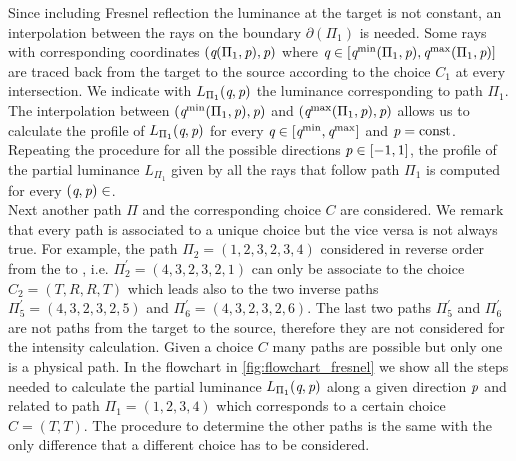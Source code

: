 Since including Fresnel reflection the luminance at the target is not constant, an interpolation between the rays on the boundary $\partial$$(\Pi_1)$ is needed. 
Some rays with corresponding coordinates $(\textit{q}(\Pi_1, \textit{p}), \textit{p})$ where 
$\textit{q}\in[\textit{q}^{\textrm{min}}(\Pi_1, \textit{p}), \textit{q}^{\textrm{max}}(\Pi_1, \textit{p})]$ are traced back from the target to the source according to the choice $C_1$ at every intersection.
We indicate with $L_{\Pi_1}(\textit{q},\textit{p})$ the luminance corresponding to path $\Pi_1$. The interpolation between 
$(\textit{q}^{\textrm{min}}(\Pi_1, \textit{p}), \textit{p})$ and $(\textit{q}^{\textrm{max}}(\Pi_1, \textit{p}), \textit{p})$ allows us to calculate the profile of $L_{\Pi_1}(\textit{q},\textit{p})$ for every $\textit{q}\in[\textit{q}^{\textrm{min}}, \textit{q}^{\textrm{max}}]$ and $\textit{p}=\textrm{const}$.
Repeating the procedure for all the possible directions $\textit{p}\in[-1,1]$, the profile of the partial luminance $L_{\Pi_1}$ given by all the rays that follow path $\Pi_1$ is computed for every $(\textit{q}, \textit{p})\in$. 
\\ \indent Next another path $\Pi$ and the corresponding choice $C$ are considered. We remark that every path is associated to a unique choice but the vice versa is not always true. For example, the path $\Pi_2 = (1,2,3,2,3,4)$ considered in reverse order from the  to , i.e. $\Pi_2^{\prime} = (4,3,2,3,2,1)$ can only be associate to the choice $C_2 = (T,R,R,T)$ which leads also to the two inverse paths $\Pi_5^{\prime}= (4,3,2,3,2,5)$ and $\Pi_6^{\prime}= (4,3,2,3,2,6)$. The last two paths $\Pi_5^{\prime}$ and $\Pi_6^{\prime}$ are not paths from the target to the source, therefore they are not considered for the intensity calculation. Given a choice $C$ many paths are possible but only one is a physical path. In the flowchart in \ref{fig:flowchart_fresnel} we show all the steps needed to calculate the partial luminance $L_{\Pi_1}(\textit{q}, \textit{p})$  along a given direction $\textit{p}$ and related to path $\Pi_1 = (1,2,3,4)$ which corresponds to a certain choice $C= (T,T)$. The procedure to determine the other paths is the same with the only difference that a different choice has to be considered.
